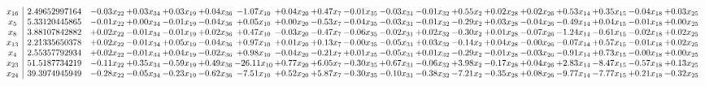 \documentclass[9pt]{article}
\begin{document}
 \[\begin{array}{c| c c@{\hskip 2pt} c@{\hskip 2pt} c@{\hskip 2pt} c@{\hskip 2pt} c@{\hskip 2pt} c@{\hskip 2pt} c@{\hskip 2pt} c@{\hskip 2pt} c@{\hskip 2pt} c@{\hskip 2pt} c@{\hskip 2pt} c@{\hskip 2pt} c@{\hskip 2pt} c@{\hskip 2pt} c@{\hskip 2pt} c@{\hskip 2pt} c@{\hskip 2pt} }
 x_{16}   &  2.49652997164 & -0.03 x_{22} & +  0.03 x_{34} & +  0.03 x_{19} & +  0.04 x_{36} & -1.07 x_{10} & +  0.04 x_{20} & +  0.47 x_{7} & -0.01 x_{35} & -0.03 x_{31} & -0.01 x_{32} & +  0.55 x_{2} & +  0.02 x_{28} & +  0.02 x_{26} & +  0.53 x_{14} & +  0.35 x_{15} & -0.04 x_{18} & +  0.03 x_{25}\\
 x_{5}   &  5.33120445865 & -0.01 x_{22} & +  0.00 x_{34} & -0.01 x_{19} & -0.04 x_{36} & +  0.05 x_{10} & +  0.00 x_{20} & -0.53 x_{7} & -0.04 x_{35} & -0.03 x_{31} & -0.01 x_{32} & -0.29 x_{2} & +  0.03 x_{28} & -0.04 x_{26} & -0.49 x_{14} & +  0.04 x_{15} & -0.01 x_{18} & +  0.00 x_{25}\\
 x_{8}   &  3.88107842882 & +  0.02 x_{22} & -0.01 x_{34} & -0.01 x_{19} & +  0.02 x_{36} & +  0.47 x_{10} & -0.03 x_{20} & -0.47 x_{7} & -0.06 x_{35} & -0.02 x_{31} & +  0.02 x_{32} & -0.30 x_{2} & +  0.01 x_{28} & -0.07 x_{26} & -1.24 x_{14} & -0.61 x_{15} & -0.02 x_{18} & +  0.02 x_{25}\\
 x_{13}   &  2.21335650378 & +  0.02 x_{22} & -0.01 x_{34} & +  0.05 x_{19} & -0.04 x_{36} & +  0.97 x_{10} & +  0.01 x_{20} & +  0.13 x_{7} & -0.00 x_{35} & -0.05 x_{31} & +  0.03 x_{32} & -0.14 x_{2} & +  0.04 x_{28} & -0.00 x_{26} & -0.07 x_{14} & +  0.57 x_{15} & -0.01 x_{18} & +  0.02 x_{25}\\
 x_{4}   &  2.55357792934 & +  0.02 x_{22} & -0.01 x_{34} & +  0.04 x_{19} & -0.02 x_{36} & +  0.98 x_{10} & -0.04 x_{20} & -0.21 x_{7} & +  0.01 x_{35} & -0.05 x_{31} & +  0.01 x_{32} & -0.29 x_{2} & -0.01 x_{28} & -0.03 x_{26} & -0.91 x_{14} & +  0.73 x_{15} & -0.00 x_{18} & +  0.00 x_{25}\\
 x_{23}   &  51.5187734219 & -0.11 x_{22} & +  0.35 x_{34} & -0.59 x_{19} & +  0.49 x_{36} & -26.11 x_{10} & +  0.77 x_{20} & +  6.05 x_{7} & -0.30 x_{35} & +  0.67 x_{31} & -0.06 x_{32} & +  3.98 x_{2} & -0.17 x_{28} & +  0.04 x_{26} & +  2.83 x_{14} & -8.47 x_{15} & -0.57 x_{18} & +  0.13 x_{25}\\
 x_{24}   &  39.3974945949 & -0.28 x_{22} & -0.05 x_{34} & -0.23 x_{19} & -0.62 x_{36} & -7.51 x_{10} & +  0.52 x_{20} & +  5.87 x_{7} & -0.30 x_{35} & -0.10 x_{31} & -0.38 x_{32} & -7.21 x_{2} & -0.35 x_{28} & +  0.08 x_{26} & -9.77 x_{14} & -7.77 x_{15} & +  0.21 x_{18} & -0.32 x_{25}\\

\end{array}\]
\end{document}
